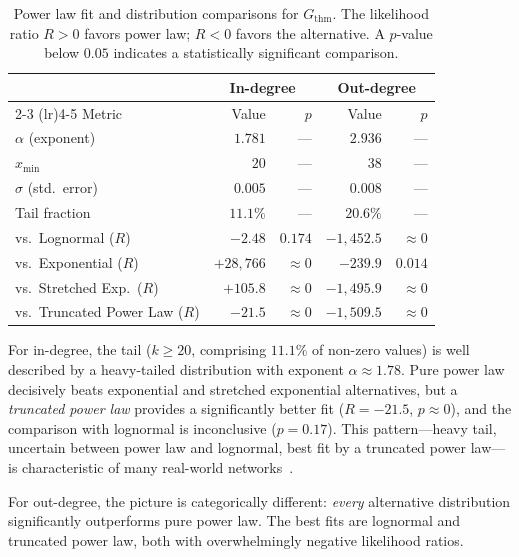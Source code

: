 \begin{table}[ht]
\centering
\caption{Power law fit and distribution comparisons for $G_{\mathrm{thm}}$. The likelihood ratio $R > 0$ favors power law; $R < 0$ favors the alternative. A $p$-value below $0.05$ indicates a statistically significant comparison.}
\label{tab:thm-powerlaw}
\begin{tabular}{lrrrr}
\toprule
& \multicolumn{2}{c}{In-degree} & \multicolumn{2}{c}{Out-degree} \\
\cmidrule(lr){2-3} \cmidrule(lr){4-5}
Metric & Value & $p$ & Value & $p$ \\
\midrule
$\alpha$ (exponent)     & $1.781$ & --- & $2.936$ & --- \\
$x_{\min}$              & $20$    & --- & $38$    & --- \\
$\sigma$ (std.\ error)  & $0.005$ & --- & $0.008$ & --- \\
Tail fraction           & $11.1\%$ & --- & $20.6\%$ & --- \\
\midrule
vs.\ Lognormal ($R$)          & $-2.48$   & $0.174$   & $-1{,}452.5$ & $\approx 0$ \\
vs.\ Exponential ($R$)        & $+28{,}766$ & $\approx 0$ & $-239.9$ & $0.014$ \\
vs.\ Stretched Exp.\ ($R$)    & $+105.8$  & $\approx 0$ & $-1{,}495.9$ & $\approx 0$ \\
vs.\ Truncated Power Law ($R$) & $-21.5$  & $\approx 0$ & $-1{,}509.5$ & $\approx 0$ \\
\bottomrule
\end{tabular}
\end{table}

For in-degree, the tail ($k \ge 20$, comprising $11.1\%$ of non-zero values) is well described by a heavy-tailed distribution with exponent $\alpha \approx 1.78$. Pure power law decisively beats exponential and stretched exponential alternatives, but a \emph{truncated power law} provides a significantly better fit ($R = -21.5$, $p \approx 0$), and the comparison with lognormal is inconclusive ($p = 0.17$). This pattern---heavy tail, uncertain between power law and lognormal, best fit by a truncated power law---is characteristic of many real-world networks~\cite{clauset2009}.

For out-degree, the picture is categorically different: \emph{every} alternative distribution significantly outperforms pure power law. The best fits are lognormal and truncated power law, both with overwhelmingly negative likelihood ratios.

